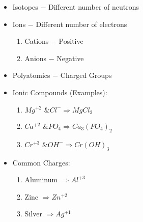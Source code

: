 \documentclass[12pt]{article}
\begin{document}
\begin{itemize}
\item Isotopes $-$ Different number of neutrons

\item Ions $-$ Different number of electrons

  \begin{enumerate}

    \item Cations $-$ Positive

    \item Anions $-$ Negative

  \end{enumerate}

\item Polyatomics $-$ Charged Groups

\item Ionic Compounds (Examples):

  \begin{enumerate}

    \item $Mg^{+2}\text{ \& }Cl^-\Rightarrow MgCl_2$

    \item $Ca^{+2}\text{ \& }PO_4\Rightarrow Ca_3(PO_4)_2$

    \item $Cr^{+3}\text{ \& }OH^-\Rightarrow Cr(OH)_3$

  \end{enumerate}

\item Common Charges:

  \begin{enumerate}

    \item Aluminum $\Rightarrow Al^{+3}$

    \item Zinc $\Rightarrow Zn^{+2}$

    \item Silver $\Rightarrow Ag^{+1}$

  \end{enumerate}

\end{itemize}
\end{document}
